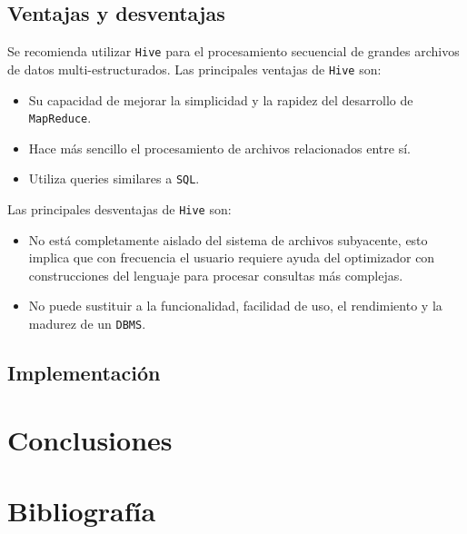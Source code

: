 \documentclass[]{article}
\begin{document}
\subsection{Ventajas y desventajas}\label{ventajas-y-desventajas-4}

Se recomienda utilizar \texttt{Hive} para el procesamiento secuencial de
grandes archivos de datos multi-estructurados. Las principales ventajas
de \texttt{Hive} son:

\begin{itemize}
\itemsep1pt\parskip0pt
\item
  Su capacidad de mejorar la simplicidad y la rapidez del desarrollo de
  \texttt{MapReduce}.
\item
  Hace más sencillo el procesamiento de archivos relacionados entre sí.
\item
  Utiliza queries similares a \texttt{SQL}.
\end{itemize}

Las principales desventajas de \texttt{Hive} son:

\begin{itemize}
\itemsep1pt\parskip0pt
\item
  No está completamente aislado del sistema de archivos subyacente, esto
  implica que con frecuencia el usuario requiere ayuda del optimizador
  con construcciones del lenguaje para procesar consultas más complejas.
\item
  No puede sustituir a la funcionalidad, facilidad de uso, el
  rendimiento y la madurez de un \texttt{DBMS}.
\end{itemize}

\subsection{Implementación}\label{implementacion-5}

\section{Conclusiones}\label{conclusiones}

\section{Bibliografía}\label{bibliografia}
\end{document}
